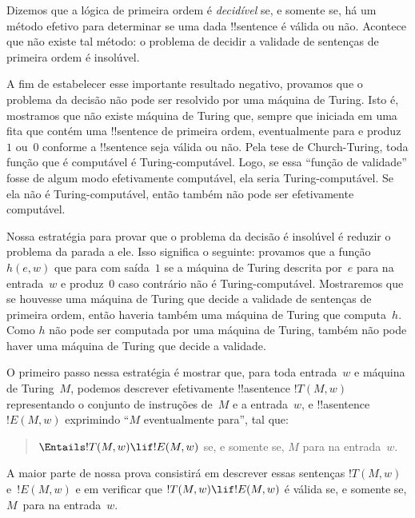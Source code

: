 \documentclass[../../../include/open-logic-section]{subfiles}
\begin{document}

Dizemos que a lógica de primeira ordem é \emph{decidível} se, e
somente se, há um método efetivo para determinar se uma dada
!!{sentence} é válida ou não. Acontece que não existe tal método: o
problema de decidir a validade de sentenças de primeira ordem é
insolúvel.

A fim de estabelecer esse importante resultado negativo, provamos que
o problema da decisão não pode ser resolvido por uma máquina de
Turing. Isto é, mostramos que não existe máquina de Turing que, sempre
que iniciada em uma fita que contém uma !!{sentence} de primeira
ordem, eventualmente para e produz $1$ ou~$0$ conforme a
!!{sentence} seja válida ou não. Pela tese de Church-Turing, toda
função que é computável é Turing-computável. Logo, se essa ``função de
validade'' fosse de algum modo efetivamente computável, ela seria
Turing-computável. Se ela não é Turing-computável, então também não
pode ser efetivamente computável.

Nossa estratégia para provar que o problema da decisão é insolúvel é
reduzir o problema da parada a ele. Isso significa o seguinte:
provamos que a função~$h(e,w)$ que para com saída~$1$ se a máquina de
Turing descrita por~$e$ para na entrada~$w$ e produz~$0$ caso
contrário não é Turing-computável. Mostraremos que se houvesse uma
máquina de Turing que decide a validade de sentenças de primeira
ordem, então haveria também uma máquina de Turing que computa~$h$.
Como $h$ não pode ser computada por uma máquina de Turing, também não
pode haver uma máquina de Turing que decide a validade.

O primeiro passo nessa estratégia é mostrar que, para toda entrada~$w$
e máquina de Turing~$M$, podemos descrever efetivamente !!a{sentence}
$!T(M, w)$ representando o conjunto de instruções de~$M$ e a
entrada~$w$, e !!a{sentence}~$!E(M, w)$ exprimindo ``$M$ eventualmente
para'', tal que:
\begin{quote}
  $\Entails !T(M, w) \lif !E(M,w)$ se, e somente se, $M$ para na
  entrada~$w$.
\end{quote}
A maior parte de nossa prova consistirá em descrever essas sentenças
$!T(M, w)$ e~$!E(M, w)$ e em verificar que $!T(M, w) \lif !E(M, w)$
é válida se, e somente se, $M$~para na entrada~$w$.
\end{document}
